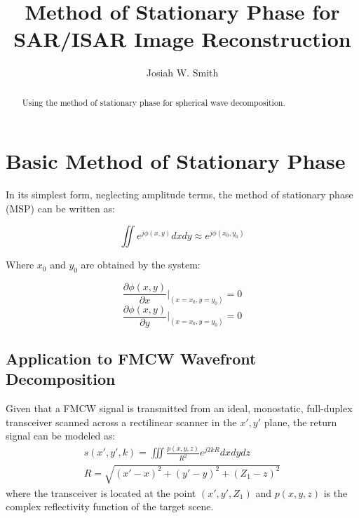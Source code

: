 \documentclass{IEEEtran}
\title{Method of Stationary Phase for SAR/ISAR Image Reconstruction}
\author{Josiah W. Smith}
\begin{document}
\maketitle

\begin{abstract}

Using the method of stationary phase for spherical wave decomposition.

\end {abstract}


\section{Basic Method of Stationary Phase}
In its simplest form, neglecting amplitude terms, the method of stationary phase (MSP) can be written as: 

\begin{equation}
	\iint e^{j\phi(x,y)} dxdy \approx e^{j\phi(x_0,y_0)}
\end{equation}

Where $x_0$ and $y_0$ are obtained by the system:

\begin{equation}
\frac{\partial \phi(x,y)}{\partial x} \biggr\rvert_{(x=x_0,y=y_0)} = 0
\end{equation}
\begin{equation}
\frac{\partial \phi(x,y)}{\partial y} \biggr\rvert_{(x=x_0,y=y_0)} = 0
\end{equation}

\subsection{Application to FMCW Wavefront Decomposition}
Given that a FMCW signal is transmitted from an ideal, monostatic, full-duplex transceiver scanned across a rectilinear scanner in the $x',y'$ plane, the return signal can be modeled as:
\begin{gather}
	s(x',y',k) = \iiint \frac{p(x,y,z)}{R^2} e^{j2kR} dx dy dz \\
	R = \sqrt{ (x' - x)^2 + (y' - y)^2 + (Z_1 - z)^2 }
\end{gather}
where the transceiver is located at the point $(x',y',Z_1)$ and $p(x,y,z)$ is the complex reflectivity function of the target scene.
\end{document}
